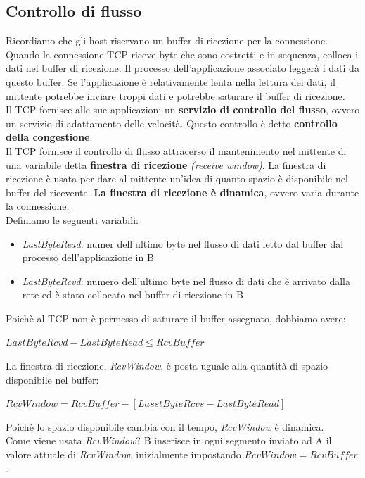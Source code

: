 \documentclass[11pt,a4paper]{book}
\begin{document}
\subsection{Controllo di flusso}
Ricordiamo che gli host riservano un buffer di ricezione per la connessione. Quando la connessione TCP riceve byte che sono costretti e in sequenza, colloca i dati nel buffer di ricezione. Il processo dell'applicazione associato leggerà i dati da questo buffer. Se l'applicazione è relativamente lenta nella lettura dei dati, il mittente potrebbe inviare troppi dati e potrebbe saturare il buffer di ricezione. \\
Il TCP fornisce alle sue applicazioni un \textbf{servizio di controllo del flusso}, ovvero un servizio di adattamento delle velocità. Questo controllo è detto \textbf{controllo della congestione}. \\
Il TCP fornisce il controllo di flusso attracerso il mantenimento nel mittente di una variabile detta \textbf{finestra di ricezione} \textit{(receive window)}. La finestra di ricezione è usata per dare al mittente un'idea di quanto spazio è disponibile nel buffer del ricevente. \textbf{La finestra di ricezione è dinamica}, ovvero varia durante la connessione. \\
Definiamo le seguenti variabili:
\begin{itemize}
	\item \emph{LastByteRead}: numer dell'ultimo byte nel flusso di dati letto dal buffer dal processo dell'applicazione in B
	\item \emph{LastByteRcvd}: numero dell'ultimo byte nel flusso di dati che è arrivato dalla rete ed è stato collocato nel buffer di ricezione in B
\end{itemize}
Poichè al TCP non è permesso di saturare il buffer assegnato, dobbiamo avere:
\begin{center}
	$LastByteRcvd - LastByteRead \leq RcvBuffer$
\end{center}
La finestra di ricezione, \emph{RcvWindow}, è posta uguale alla quantità di spazio disponibile nel buffer:
\begin{center}
	$RcvWindow = RcvBuffer - [LasstByteRcvs - LastByteRead]$
\end{center}
Poichè lo spazio disponibile cambia con il tempo, \emph{RcvWindow} è dinamica. \\
Come viene usata \emph{RcvWindow}? B inserisce in ogni segmento inviato ad A il valore attuale di \emph{RcvWindow}, inizialmente impostando $RcvWindow = RcvBuffer$. \\
\end{document}
